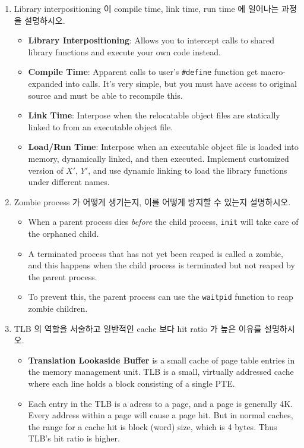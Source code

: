 \documentclass[12pt]{article}
\begin{document}
{\begin{enumerate}
\pagebreak
\item Library interpositioning 이 compile time, link time, run time 에 일어나는 과정을 설명하시오.
\begin{itemize}
	\item \textbf{Library Interpositioning}: Allows you to intercept calls to shared library functions and execute your own code instead.
	\item \textbf{Compile Time}: Apparent calls to user's \texttt{\#define} function get macro-expanded into calls. It's very simple, but you must have access to original source and must be able to recompile this.
	\item \textbf{Link Time}: Interpose when the relocatable object files are statically linked to from an executable object file.
	\item \textbf{Load/Run Time}: Interpose when an executable object file is loaded into memory, dynamically linked, and then executed. Implement customized version of $X'$, $Y'$, and use dynamic linking to load the library functions under different names.
\end{itemize}	
\item Zombie process 가 어떻게 생기는지, 이를 어떻게 방지할 수 있는지 설명하시오.
\begin{itemize}
	\item When a parent process dies \textit{before} the child process, \texttt{init} will take care of the orphaned child.
	\item A terminated process that has not yet been reaped is called a zombie, and this happens when the child process is terminated but not reaped by the parent process.
	\item To prevent this, the parent process can use the \texttt{waitpid} function to reap zombie children.
\end{itemize}

\item TLB 의 역할을 서술하고 일반적인 cache 보다 hit ratio 가 높은 이유를 설명하시오.
\begin{itemize}
	\item \textbf{Translation Lookaside Buffer} is a small cache of page table entries in the memory management unit. TLB is a small, virtually addressed cache where each line holds a block consisting of a single PTE.
	\item Each entry in the TLB is a adress to a page, and a page is generally 4K. Every address within a page will cause a page hit. But in normal caches, the range for a cache hit is block (word) size, which is 4 bytes. Thus TLB's hit ratio is higher.
\end{itemize}


\end{enumerate}}
\end{document}
